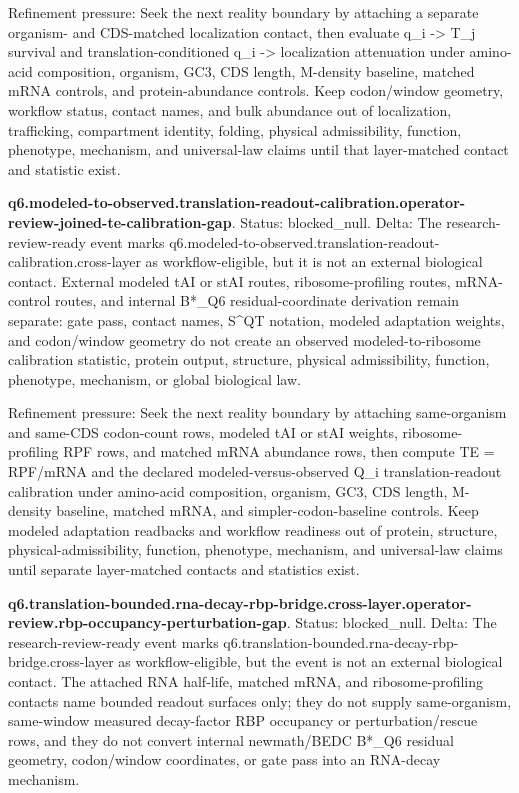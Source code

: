 Refinement pressure: Seek the next reality boundary by attaching a separate organism- and CDS-matched localization contact, then evaluate q\_i -> T\_j survival and translation-conditioned q\_i -> localization attenuation under amino-acid composition, organism, GC3, CDS length, M-density baseline, matched mRNA controls, and protein-abundance controls. Keep codon/window geometry, workflow status, contact names, and bulk abundance out of localization, trafficking, compartment identity, folding, physical admissibility, function, phenotype, mechanism, and universal-law claims until that layer-matched contact and statistic exist.

\textbf{q6.modeled-to-observed.translation-readout-calibration.operator-review-joined-te-calibration-gap}. Status: blocked\_null. Delta: The research-review-ready event marks q6.modeled-to-observed.translation-readout-calibration.cross-layer as workflow-eligible, but it is not an external biological contact. External modeled tAI or stAI routes, ribosome-profiling routes, mRNA-control routes, and internal B*\_Q6 residual-coordinate derivation remain separate: gate pass, contact names, S\textasciicircum{}QT notation, modeled adaptation weights, and codon/window geometry do not create an observed modeled-to-ribosome calibration statistic, protein output, structure, physical admissibility, function, phenotype, mechanism, or global biological law.

Refinement pressure: Seek the next reality boundary by attaching same-organism and same-CDS codon-count rows, modeled tAI or stAI weights, ribosome-profiling RPF rows, and matched mRNA abundance rows, then compute TE = RPF/mRNA and the declared modeled-versus-observed Q\_i translation-readout calibration under amino-acid composition, organism, GC3, CDS length, M-density baseline, matched mRNA, and simpler-codon-baseline controls. Keep modeled adaptation readbacks and workflow readiness out of protein, structure, physical-admissibility, function, phenotype, mechanism, and universal-law claims until separate layer-matched contacts and statistics exist.

\textbf{q6.translation-bounded.rna-decay-rbp-bridge.cross-layer.operator-review.rbp-occupancy-perturbation-gap}. Status: blocked\_null. Delta: The research-review-ready event marks q6.translation-bounded.rna-decay-rbp-bridge.cross-layer as workflow-eligible, but the event is not an external biological contact. The attached RNA half-life, matched mRNA, and ribosome-profiling contacts name bounded readout surfaces only; they do not supply same-organism, same-window measured decay-factor RBP occupancy or perturbation/rescue rows, and they do not convert internal newmath/BEDC B*\_Q6 residual geometry, codon/window coordinates, or gate pass into an RNA-decay mechanism.

